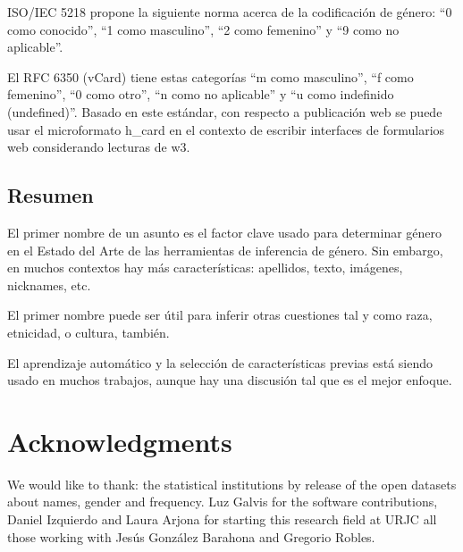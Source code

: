 \documentclass[a4paper]{article}
\begin{document}
ISO/IEC 5218 propone la siguiente norma acerca de la codificación
de género: ``0 como conocido'', ``1 como masculino'', ``2 como femenino''
y ``9 como no aplicable''.

El RFC 6350 (vCard) tiene estas categorías ``m como masculino'',
``f como femenino'', ``0 como otro'', ``n como no aplicable'' y
``u como indefinido (undefined)''. Basado en este estándar, con
respecto a publicación web se puede usar el microformato h_card
en el contexto de escribir interfaces de formularios web considerando
lecturas de w3.

\subsection{Resumen}

El primer nombre de un asunto es el factor clave usado para
determinar género en el Estado del Arte de las herramientas de
inferencia de género. Sin embargo, en muchos contextos hay más
características: apellidos, texto, imágenes, nicknames, etc.

El primer nombre puede ser útil para inferir otras cuestiones
tal y como raza, etnicidad, o cultura, también.

El aprendizaje automático y la selección de características
previas está siendo usado en muchos trabajos, aunque hay una
discusión tal que es el mejor enfoque.



\section*{Acknowledgments}

We would like to thank: the statistical institutions by
release of the open datasets about names, gender and frequency.
Luz Galvis for the software contributions, Daniel Izquierdo and
Laura Arjona for starting this research field at URJC all those
working with Jesús González Barahona and Gregorio Robles. 



\end{document}
